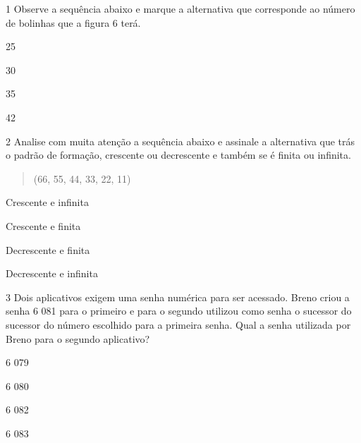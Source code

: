
\num{1} Observe a sequência abaixo e marque a alternativa que corresponde
ao número de bolinhas que a figura 6 terá.


\begin{escolha}
\item
  25
\item
  30
\item
  35
\item
  42
\end{escolha}


\num{2} Analise com muita atenção a sequência abaixo e assinale a
alternativa que trás o padrão de formação, crescente ou decrescente e
também se é finita ou infinita.

\begin{quote}
(66, 55, 44, 33, 22, 11)
\end{quote}

\begin{escolha}
\item
  Crescente e infinita
\item
  Crescente e finita
\item
  Decrescente e finita
\item
  Decrescente e infinita
\end{escolha}


\num{3} Dois aplicativos exigem uma senha numérica para ser acessado. Breno
criou a senha 6 081 para o primeiro e para o segundo utilizou como senha
o sucessor do sucessor do número escolhido para a primeira senha. Qual a
senha utilizada por Breno para o segundo aplicativo?

\begin{escolha}
\item
  6 079
\item
  6 080
\item
  6 082
\item
  6 083
\end{escolha}

